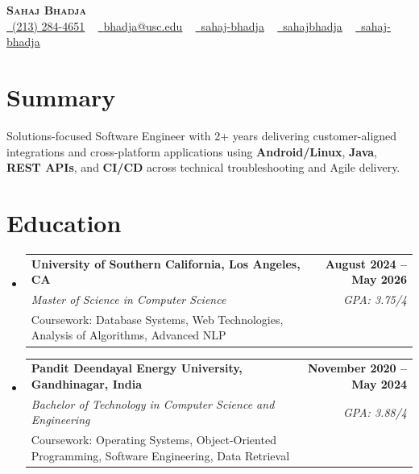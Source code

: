 \documentclass[letterpaper,10pt]{article}
\makeatletter
\newcommand{\sectionGap}{\vspace{-8pt}}
\newcommand{\resumeEduSubheading}[5]{\vspace{-1pt}\item\begin{tabular*}{1.0\textwidth}[t]{l@{\extracolsep{\fill}}r}\textbf{#1} & \textbf{\small #2} \\\textit{\small #3} & \textit{\small #4} \\\small #5 & \\\end{tabular*}\vspace{-4pt}}
\newcommand{\resumeSubHeadingListStart}{\begin{itemize}[leftmargin=0.0in, label={}]}
\newcommand{\resumeSubHeadingListEnd}{\end{itemize}}
\makeatother
\begin{document}
\begin{center}
{\Huge \scshape \textbf{Sahaj Bhadja}} \\ \vspace{1pt}
\small \href{tel:2132844651}{\faPhone\ \underline{(213) 284-4651}} ~ \href{mailto:bhadja@usc.edu}{\raisebox{-0.2\height}\faEnvelope\ \underline{bhadja@usc.edu}} ~
\href{https://www.linkedin.com/in/sahaj-bhadja/}{\raisebox{-0.2\height}\faLinkedin\ \underline{sahaj-bhadja}} ~ \href{https://github.com/SAHAJ-BHADJA}{\raisebox{-0.2\height}\faGithub\ \underline{sahajbhadja}} ~
\href{https://sahaj-bhadja.vercel.app/}{\raisebox{-0.2\height}\faGlobe\ \underline{sahaj-bhadja}}
\end{center}
\vspace{-16pt}
\section{Summary}
\begin{itemize}[leftmargin=0.15in, label={}]
\small{\item{Solutions-focused Software Engineer with 2+ years delivering customer-aligned integrations and cross-platform applications using \textbf{Android/Linux}, \textbf{Java}, \textbf{REST APIs}, and \textbf{CI/CD} across technical troubleshooting and Agile delivery.}}
\end{itemize}
\sectionGap
\section{Education}
\resumeSubHeadingListStart
\resumeEduSubheading{University of Southern California, Los Angeles, CA}{August 2024 -- May 2026}{Master of Science in Computer Science}{GPA: 3.75/4}{Coursework: Database Systems, Web Technologies, Analysis of Algorithms, Advanced NLP}
\resumeEduSubheading{Pandit Deendayal Energy University, Gandhinagar, India}{November 2020 -- May 2024}{Bachelor of Technology in Computer Science and Engineering}{GPA: 3.88/4}{Coursework: Operating Systems, Object-Oriented Programming, Software Engineering, Data Retrieval}
\resumeSubHeadingListEnd
\sectionGap
\end{document}
